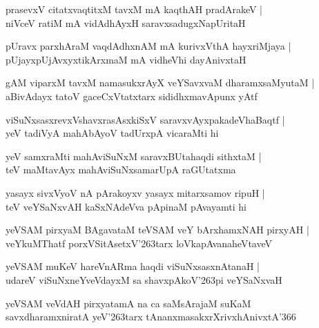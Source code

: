 \documentclass[twoside,12pt,openright]{book}
\def\S{\char'263}
\newcounter{shloka}[chapter]
\begin{document}
\begin{shloka}%
prasevxV citatxvaqtitxM tavxM mA kaqthAH pradArakeV |\\
niVceV ratiM mA vidAdhAyxH saravxsadugxNapUritaH 
\end{shloka}

\begin{shloka}%
pUravx parxhAraM vaqdAdhxnAM mA kurivxVthA hayxriMjaya |\\
pUjayxpUjAvxyxtikArxmaM mA vidheVhi dayAnivxtaH 
\end{shloka}

\begin{shloka}%
gAM viparxM tavxM namasukxrAyX veYSavxvaM dharamxsaMyutaM |\\
aBivAdayx tatoV gaceCxVtatxtarx sididhxmavApunx yAtf 
\end{shloka}

\begin{shloka}%
viSuNxsasxrevxVshavxrasAsxkiSxV saravxvAyxpakadeVhaBaqtf |\\
yeV tadiVyA mahAbAyoV tadUrxpA vicaraMti hi
\end{shloka}

\begin{shloka}%
yeV samxraMti mahAviSuNxM saravxBUtahaqdi sithxtaM |\\
teV maMtavAyx mahAviSuNxsamarUpA raGUtatxma
\end{shloka}

\begin{shloka}%
yasayx sivxVyoV nA pArakoyxv yasayx mitarxsamov ripuH |\\
teV veYSaNxvAH kaSxNAdeVva pApinaM pAvayamti hi
\end{shloka}

\begin{shloka}%
yeVSAM pirxyaM BAgavataM teVSAM veY bArxhamxNAH pirxyAH |\\
veYkuMThatf porxVSitAsetxV\S tarx loVkapAvanaheVtaveV
\end{shloka}

\begin{shloka}%
yeVSAM muKeV hareVnARma haqdi viSuNxsasxnAtanaH |\\
udareV viSuNxneYveVdayxM sa shavxpAkoV\S pi veYSaNxvaH 
\end{shloka}

\begin{shloka}%
yeVSAM veVdAH pirxyatamA na ca saMsArajaM suKaM \\
savxdharamxniratA yeV\S tarx tAnanxmasakxrXrivxhAnivxtA\char'366
\end{shloka}
\end{document}
